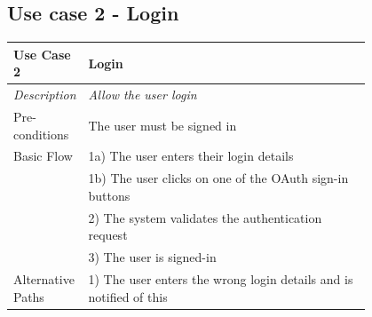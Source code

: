 \documentclass[12pt]{article}
\begin{document}
	\subsection{Use case 2 - Login}
	\label{chap:use-cases-2}	
	\begin{table}[H]
		\begin{tabular}{|l|p{0.8\linewidth}}
			\hline
			\rowcolor[HTML]{EFEFEF} 
			\textbf{Use Case 2}  & \textbf{Login}                                            \\ \hline
			\rowcolor[HTML]{F5FBFF} 
			\textit{Description} & \textit{Allow the user login}                          \\ \hline
			\rowcolor[HTML]{EFEFEF} 
			Pre-conditions       & The user must be signed in                                         \\ \hline
			\rowcolor[HTML]{F5FBFF} 
			Basic Flow           & 1a) The user enters their login details                            \\
			\rowcolor[HTML]{F5FBFF} 
			& 1b) The user clicks on one of the OAuth sign-in buttons            \\
			\rowcolor[HTML]{F5FBFF} 
			& 2) The system validates the authentication request                 \\
			\rowcolor[HTML]{F5FBFF} 
			& 3) The user is signed-in                                           \\ \hline
			\rowcolor[HTML]{EFEFEF} 
			Alternative Paths    & 1) The user enters the wrong login details and is notified of this
		\end{tabular}
	\end{table}
	
\end{document}
